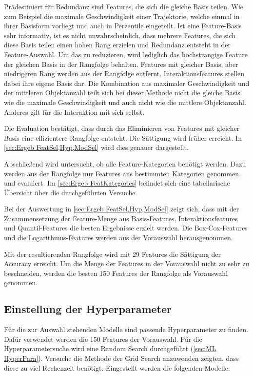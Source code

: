 Prädestiniert für Redundanz sind Features, die sich die gleiche Basis teilen. Wie zum Beispiel die maximale Geschwindigkeit einer Trajektorie, welche einmal in ihrer Basisform vorliegt und auch in Perzentile eingeteilt. Ist eine Feature-Basis sehr informativ, ist es nicht unwahrscheinlich, dass mehrere Features, die sich diese Basis teilen einen hohen Rang erzielen und Redundanz entsteht in der Feature-Auswahl. Um das zu reduzieren, wird lediglich das höchstrangige Feature der gleichen Basis in der Rangfolge behalten. Features mit gleicher Basis, aber niedrigeren Rang werden aus der Rangfolge entfernt. Interaktionsfeatures stellen dabei ihre eigene Basis dar. Die Kombination aus maximaler Geschwindigkeit und der mittleren Objektanzahl teilt sich bei dieser Methode nicht die gleiche Basis wie die maximale Geschwindigkeit und auch nicht wie die mittlere Objektanzahl. Anderes gilt für die Interaktion mit sich selbst. \par

Die Evaluation bestätigt, dass durch das Eliminieren von Features mit gleicher Basis eine effizientere Rangfolge entsteht. Die Sättigung wird früher erreicht. In \autoref{sec:Ergeb FeatSel,Hyp,ModSel} wird dies genauer dargestellt. \par

Abschließend wird untersucht, ob alle Feature-Kategorien benötigt werden. Dazu werden aus der Rangfolge nur Features aus bestimmten Kategorien genommen und evaluiert. Im \autoref{sec:Ergeb FeatKategories} befindet sich eine tabellarische Übersicht über die durchgeführten Versuche. \par

Bei der Auswertung in \autoref{sec:Ergeb FeatSel,Hyp,ModSel} zeigt sich, dass mit der Zusammensetzung der Feature-Menge aus Basis-Features, Interaktionsfeatures und Quantil-Features die besten Ergebnisse erzielt werden. Die Box-Cox-Features und die Logarithmus-Features werden aus der Vorauswahl herausgenommen. \par

Mit der resultierenden Rangfolge wird mit 29 Features die Sättigung der Accuracy erreicht. Um die Menge der Features in der Vorauswahl nicht zu sehr zu beschneiden, werden die besten 150 Features der Rangfolge als Vorauswahl genommen. 



\subsection{Einstellung der Hyperparameter} \label{sec:Meth HyperparaKonf}
Für die zur Auswahl stehenden Modelle sind passende Hyperparameter zu finden. Dafür verwendet werden die 150 Features der Vorauswahl. Für die Hyperparametersuche wird eine Random Search durchgeführt (\autoref{sec:ML HyperPara}). Versuche die Methode der Grid Search anzuwenden zeigten, dass diese zu viel Rechenzeit benötigt. Eingestellt werden die folgenden Modelle.

